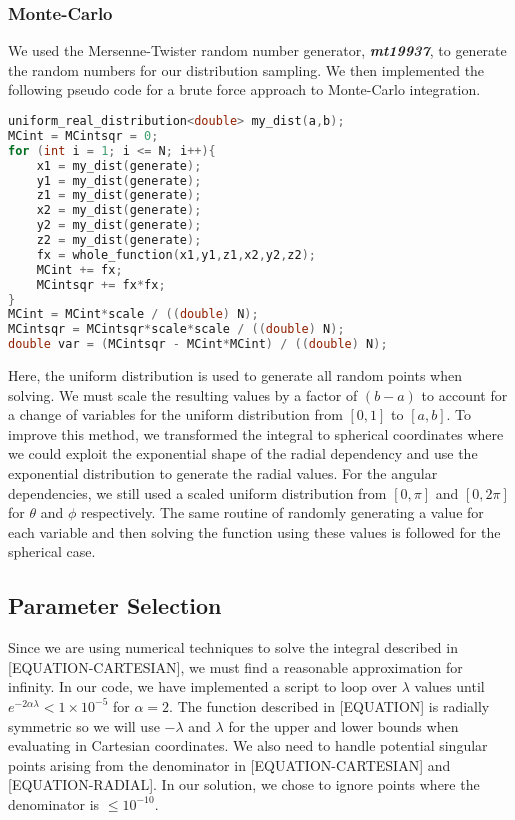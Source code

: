 \documentclass{emulateapj}
\begin{document}
\subsubsection{Monte-Carlo}
We used the Mersenne-Twister random number generator, \textbf{\textit{mt19937}}, to generate the random numbers for our distribution sampling. We then implemented the following pseudo code for a brute force approach to Monte-Carlo integration.
\begin{lstlisting}[language=c++]
uniform_real_distribution<double> my_dist(a,b);
MCint = MCintsqr = 0;
for (int i = 1; i <= N; i++){
    x1 = my_dist(generate);
    y1 = my_dist(generate);
    z1 = my_dist(generate);
    x2 = my_dist(generate);
    y2 = my_dist(generate);
    z2 = my_dist(generate);
    fx = whole_function(x1,y1,z1,x2,y2,z2);
    MCint += fx;
    MCintsqr += fx*fx;
}
MCint = MCint*scale / ((double) N);
MCintsqr = MCintsqr*scale*scale / ((double) N);
double var = (MCintsqr - MCint*MCint) / ((double) N);
\end{lstlisting}
Here, the uniform distribution is used to generate all random points when solving. We must scale the resulting values by a factor of $(b-a)$ to account for a change of variables for the uniform distribution from $[0,1]$ to $[a,b]$. To improve this method, we transformed the integral to spherical coordinates where we could exploit the exponential shape of the radial dependency and use the exponential distribution to generate the radial values. For the angular dependencies, we still used a scaled uniform distribution from $[0,\pi]$ and $[0,2\pi]$ for $\theta$ and $\phi$ respectively. The same routine of randomly generating a value for each variable and then solving the function using these values is followed for the spherical case.
\subsection{Parameter Selection}
\label{subsec:parameters}
Since we are using numerical techniques to solve the integral described in [EQUATION-CARTESIAN], we must find a reasonable approximation for infinity. In our code, we have implemented a script to loop over $\lambda$ values until $e^{-2\alpha\lambda} < 1\times10^{-5}$ for $\alpha = 2$. The function described in [EQUATION] is radially symmetric so we will use $-\lambda$ and $\lambda$ for the upper and lower bounds when evaluating in Cartesian coordinates. We also need to handle potential singular points arising from the denominator in [EQUATION-CARTESIAN] and [EQUATION-RADIAL]. In our solution, we chose to ignore points where the denominator is $\leq 10^{-10}$.
\end{document}
